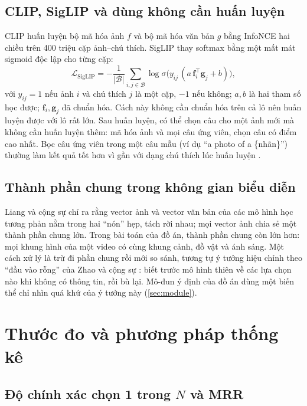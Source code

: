 \documentclass[a4paper,oneside]{report}
\begin{document}
\subsection{CLIP, SigLIP và dùng không cần huấn luyện}

CLIP \citep{radford2021clip} huấn luyện bộ mã hóa ảnh $f$ và bộ mã hóa văn bản $g$ bằng InfoNCE hai chiều trên 400 triệu cặp ảnh--chú thích. SigLIP \citep{zhai2023siglip} thay softmax bằng một mất mát sigmoid độc lập cho từng cặp:
\begin{equation}
  \mathcal{L}_{\mathrm{SigLIP}} = -\frac{1}{|\mathcal{B}|}\sum_{i,j\in\mathcal{B}} \log \sigma\!\big(y_{ij}\,(a\,\mathbf{f}_i^\top\mathbf{g}_j + b)\big),
\end{equation}
với $y_{ij}=1$ nếu ảnh $i$ và chú thích $j$ là một cặp, $-1$ nếu không; $a,b$ là hai tham số học được; $\mathbf{f}_i,\mathbf{g}_j$ đã chuẩn hóa. Cách này không cần chuẩn hóa trên cả lô nên huấn luyện được với lô rất lớn. Sau huấn luyện, có thể chọn câu cho một ảnh mới mà không cần huấn luyện thêm: mã hóa ảnh và mọi câu ứng viên, chọn câu có điểm cao nhất. Bọc câu ứng viên trong một câu mẫu (ví dụ ``a photo of a \{nhãn\}'') thường làm kết quả tốt hơn vì gần với dạng chú thích lúc huấn luyện \citep{radford2021clip}.

\subsection{Thành phần chung trong không gian biểu diễn}

Liang và cộng sự \citep{liang2022mindgap} chỉ ra rằng vector ảnh và vector văn bản của các mô hình học tương phản nằm trong hai ``nón'' hẹp, tách rời nhau; mọi vector ảnh chia sẻ một thành phần chung lớn. Trong bài toán của đồ án, thành phần chung còn lớn hơn: mọi khung hình của một video có cùng khung cảnh, đồ vật và ánh sáng. Một cách xử lý là trừ đi phần chung rồi mới so sánh, tương tự ý tưởng hiệu chỉnh theo ``đầu vào rỗng'' của Zhao và cộng sự \citep{zhao2021calibrate}: biết trước mô hình thiên về các lựa chọn nào khi không có thông tin, rồi bù lại. Mô-đun ý định của đồ án dùng một biến thể chỉ nhìn quá khứ của ý tưởng này (\cref{sec:module}).

\section{Thước đo và phương pháp thống kê}
\label{sec:stats}

\subsection{Độ chính xác chọn 1 trong $N$ và MRR}
\end{document}
